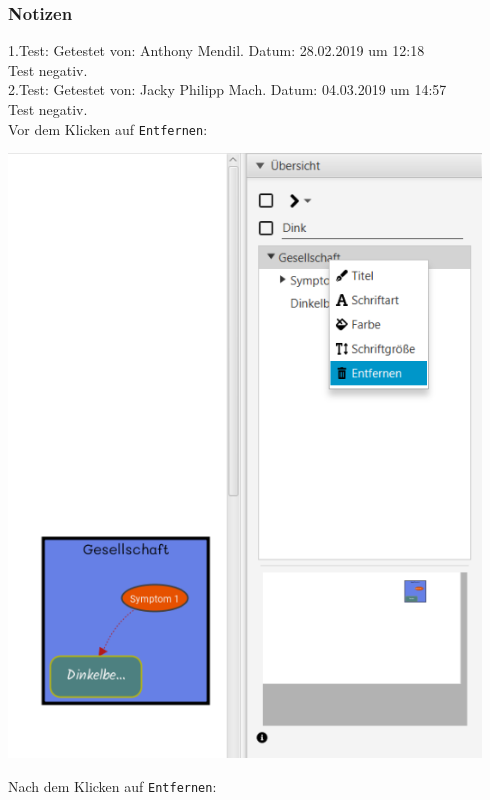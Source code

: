 \documentclass[enabledeprecatedfontcommands]{scrartcl}
\begin{document}
\subsubsection{Notizen}
1.Test: Getestet von: Anthony Mendil. Datum: 28.02.2019 um 12:18 \\
Test negativ.\\
2.Test: Getestet von: Jacky Philipp Mach. Datum: 04.03.2019 um 14:57 \\
Test negativ.\\
Vor dem Klicken auf \texttt{Entfernen}:
\begin{center}
\includegraphics[height=16cm]{sphareMitRechtsklickLoeschenVorher.PNG}
\end{center}
Nach dem Klicken auf \texttt{Entfernen}: 
\end{document}
